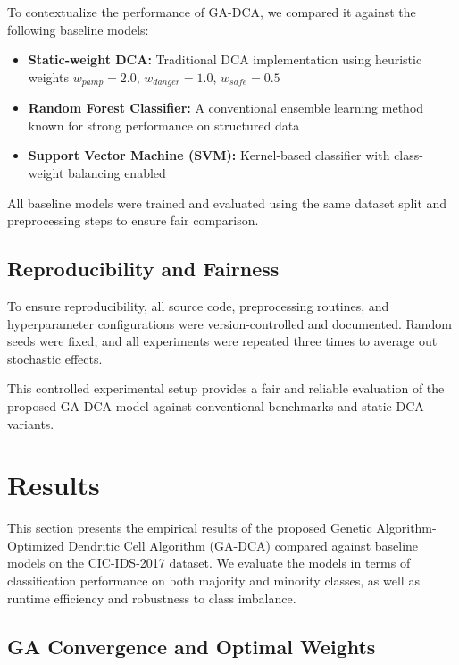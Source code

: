 \documentclass[conference]{IEEEtran}
\begin{document}
To contextualize the performance of GA-DCA, we compared it against
the following baseline models:

\begin{itemize}
  \item \textbf{Static-weight DCA:} Traditional DCA implementation
    using heuristic weights $w_{pamp} = 2.0$, $w_{danger} = 1.0$,
    $w_{safe} = 0.5$
  \item \textbf{Random Forest Classifier:} A conventional ensemble
    learning method known for strong performance on structured
    data~\cite{breiman_random_2001}
  \item \textbf{Support Vector Machine (SVM):} Kernel-based
    classifier with class-weight balancing enabled
\end{itemize}

All baseline models were trained and evaluated using the same dataset
split and preprocessing steps to ensure fair comparison.

\subsection{Reproducibility and Fairness}

To ensure reproducibility, all source code, preprocessing routines,
and hyperparameter configurations were version-controlled and
documented. Random seeds were fixed, and all experiments were
repeated three times to average out stochastic effects.

This controlled experimental setup provides a fair and reliable
evaluation of the proposed GA-DCA model against conventional
benchmarks and static DCA variants.

\section{Results}

This section presents the empirical results of the proposed Genetic
Algorithm-Optimized Dendritic Cell Algorithm (GA-DCA) compared
against baseline models on the CIC-IDS-2017 dataset. We evaluate the
models in terms of classification performance on both majority and
minority classes, as well as runtime efficiency and robustness to
class imbalance.

\subsection{GA Convergence and Optimal Weights}
\end{document}
